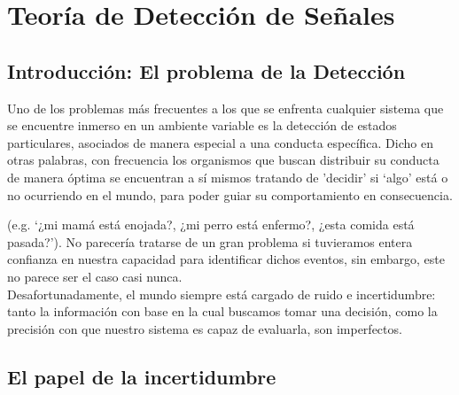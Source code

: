 
\chapter{Teoría de Detección de Señales} %

\label{Cap_SDT} %


\newcommand{\keyword}[1]{\textbf{#1}}
\newcommand{\tabhead}[1]{\textbf{#1}}
\newcommand{\code}[1]{\texttt{#1}}
\newcommand{\file}[1]{\texttt{\bfseries#1}}
\newcommand{\option}[1]{\texttt{\itshape#1}}


\section{Introducción: El problema de la Detección}

Uno de los problemas más frecuentes a los que se enfrenta cualquier sistema que se encuentre inmerso en un ambiente variable es la detección de estados particulares, asociados de manera especial a una conducta específica. Dicho en otras palabras, con frecuencia los organismos que buscan distribuir su conducta de manera óptima se encuentran a sí mismos tratando de 'decidir' si ‘algo’ está o no ocurriendo en el mundo, para poder guiar su comportamiento en consecuencia. 





(e.g. ‘¿mi mamá está enojada?, ¿mi perro está enfermo?, ¿esta comida está pasada?'). No parecería tratarse de un gran problema si tuvieramos entera confianza en nuestra capacidad para identificar dichos eventos, sin embargo, este no parece ser el caso casi nunca.\\


Desafortunadamente, el mundo siempre está cargado de ruido e incertidumbre: tanto la información con base en la cual buscamos tomar una decisión, como la precisión con que nuestro sistema es capaz de evaluarla, son imperfectos. 


\section{El papel de la incertidumbre}

